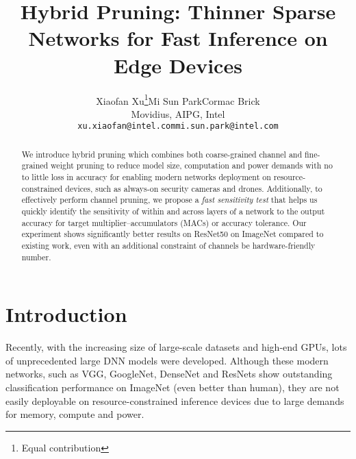 \documentclass{article}
\title{Hybrid Pruning: Thinner Sparse Networks for Fast Inference on Edge Devices}
\author{
  Xiaofan Xu\thanks{Equal contribution}\qquad Mi Sun Park\footnotemark[1] \qquad Cormac Brick\\
  Movidius, AIPG, Intel\\
  \texttt{xu.xiaofan@intel.com\qquad mi.sun.park@intel.com} \\
}
\begin{document}
\maketitle

\begin{abstract}
We introduce hybrid pruning which combines both coarse-grained channel and fine-grained weight pruning to reduce model size, computation and power demands with no to little loss in accuracy for enabling modern networks deployment on resource-constrained devices, such as always-on security cameras and drones. Additionally, to effectively perform channel pruning, we propose a \textit{fast sensitivity test} that helps us quickly identify the sensitivity of within and across layers of a network to the output accuracy for target multiplier–accumulators (MACs) or accuracy tolerance. Our experiment shows significantly better results on ResNet50 on ImageNet compared to existing work, even with an additional constraint of channels be hardware-friendly number.
\end{abstract}
\vspace{-5mm}
\section{Introduction}
Recently, with the increasing size of large-scale datasets and high-end GPUs, lots of unprecedented large DNN models were developed. Although these modern networks, such as VGG\cite{simonyan2014very}, GoogleNet\cite{szegedy2015going}, DenseNet\cite{huang2017densely} and ResNets\cite{he2016deep} show outstanding classification performance on ImageNet (even better than human), they are not easily deployable on resource-constrained inference devices due to large demands for memory, compute and power. 
\end{document}
